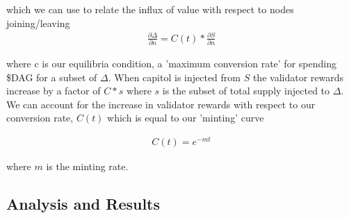 \documentclass{article}
\begin{document}
which we can use to relate the influx of value with respect to nodes joining/leaving
\begin{equation*} \label{eq1}
\begin{split}
\frac{\partial \Delta}{\partial n} = C(t)* \frac{\partial S}{\partial n}
\end{split}
\end{equation*}

where c is our equilibria condition, a 'maximum conversion rate' for spending \$DAG for a subset of $\Delta$. When capitol is injected from $S$ the validator rewards increase by a factor of $C*s$ where $s$ is the subset of total supply injected to $\Delta$. We can account for the increase in validator rewards with respect to our conversion rate, $C(t)$ which is equal to our 'minting' curve

\begin{equation*} \label{eq1}
\begin{split}
C(t) = e^{-mt}
\end{split}
\end{equation*}

where $m$ is the minting rate.
\subsection{Analysis and Results}



\end{document}
